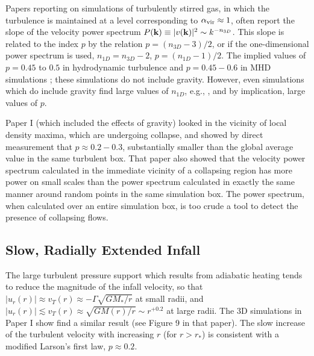 \documentclass[iop,apj,numberedappendix]{emulateapj}
\begin{document}
Papers reporting on simulations of turbulently stirred gas, in which
the turbulence is maintained at a level corresponding to $\alpha_{\rm
  vir}\approx1$, often report the slope of the velocity power
spectrum $P({\bf k})\equiv|v({\bf k})|^2\sim k^{-n_{3D}}$. This slope
is related to the index $p$ by the relation $p=(n_{3D}-3)/2$, or if
the one-dimensional power spectrum is used, $n_{1D}=n_{3D}-2$,
$p=(n_{1D}-1)/2$.  The implied values of $p=0.45$ to $0.5$ in
hydrodynamic turbulence and $p=0.45-0.6$ in MHD simulations
\citep{2007ApJ...661..972P,2006ApJ...638L..25K,2012ApJ...750...13C};
these simulations do not include gravity. However, even simulations
which do include gravity find large values of $n_{1D}$, e.g.,
\citet{2012ApJ...750...13C}, and by implication, large values of $p$.

Paper I (which included the effects of gravity) looked in the vicinity
of local density maxima, which are undergoing collapse, and showed by
direct measurement that $p\approx 0.2-0.3$, substantially smaller than
the global average value in the same turbulent box. That paper also
showed that the velocity power spectrum calculated in the immediate
vicinity of a collapsing region has more power on small scales than
the power spectrum calculated in exactly the same manner around random
points in the same simulation box. The power spectrum, when calculated
over an entire simulation box, is too crude a tool to detect the
presence of collapsing flows.

\subsection{Slow, Radially Extended Infall}\label{sec: slow infall}
The large turbulent pressure support which results from adiabatic
heating tends to reduce the magnitude of the infall velocity, so that
$|u_r(r)|\approx v_T(r)\approx-\Gamma\sqrt{GM_*/r}$ at small radii,
and $|u_r(r)|\lesssim v_T(r)\approx \sqrt{GM(r)/r}\sim r^{+0.2}$ at
large radii. The 3D simulations in Paper I show find a similar result
(see Figure 9 in that paper). The slow increase of the turbulent
velocity with increasing $r$ (for $r>r_*$) is consistent with a
modified Larson's first law, $p\approx0.2$.
\end{document}
